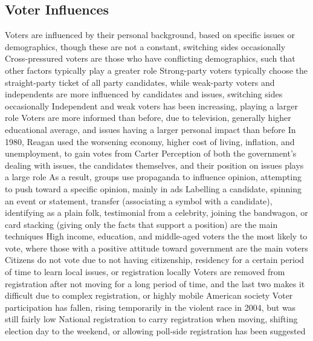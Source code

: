 \documentclass[11 pt, twoside]{article}
\newenvironment{outline*}
{
	\begin{outline}[enumerate]
	}
	{\end{outline}
}
\begin{document}
\subsection{Voter Influences}
\begin{outline*}
\1 Voters are influenced by their personal background, based on specific issues or demographics, though these are not a constant, switching sides occasionally
\2 Cross-pressured voters are those who have conflicting demographics, such that other factors typically play a greater role
\1 Strong-party voters typically choose the straight-party ticket of all party candidates, while weak-party voters and independents are more influenced by candidates and issues, switching sides occasionally
\2 Independent and weak voters has been increasing, playing a larger role
\1 Voters are more informed than before, due to television, generally higher educational average, and issues having a larger personal impact than before
\2 In 1980, Reagan used the worsening economy, higher cost of living, inflation, and unemployment, to gain votes from Carter
\1 Perception of both the government’s dealing with issues, the candidates themselves, and their position on issues plays a large role
\2 As a result, groups use propaganda to influence opinion, attempting to push toward a specific opinion, mainly in ads
\2 Labelling a candidate, spinning an event or statement, transfer (associating a symbol with a candidate), identifying as a plain folk, testimonial from a celebrity, joining the bandwagon, or card stacking (giving only the facts that support a position) are the main techniques
\1 High income, education, and middle-aged voters the the most likely to vote, where those with a positive attitude toward government are the main voters
\2 Citizens do not vote due to not having citizenship, residency for a certain period of time to learn local issues, or registration locally
\2 Voters are removed from registration after not moving for a long period of time, and the last two makes it difficult due to complex registration, or highly mobile American society
\2 Voter participation has fallen, rising temporarily in the violent race in 2004, but was still fairly low
\2 National registration to carry registration when moving, shifting election day to the weekend, or allowing poll-side registration has been suggested
\end{outline*}
\end{document}
